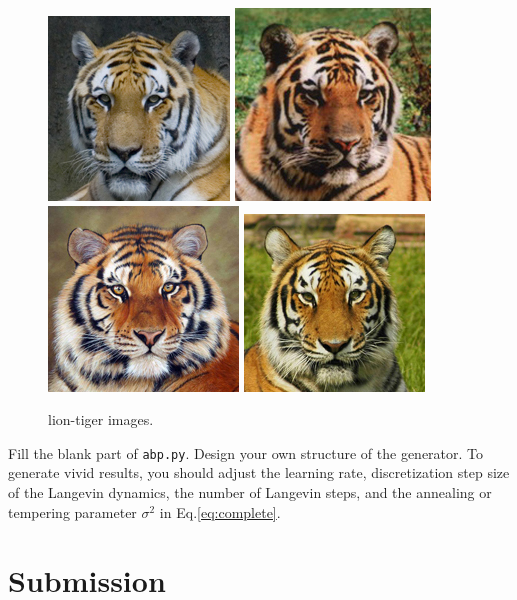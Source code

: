 \documentclass[11pt]{article}
\begin{document}
\begin{figure}[h]
{    	\includegraphics[width=.155\linewidth]{images/tiger_3.jpg}
    	\includegraphics[width=.16\linewidth]{images/tiger_4.jpg}
    	\includegraphics[width=.162\linewidth]{images/tiger_5.jpg}
    	\includegraphics[width=.16\linewidth]{images/tiger_6.jpg}
    }\\[3px]
	\caption{lion-tiger images.}
\end{figure}

Fill the blank part of \texttt{abp.py}. Design your own structure of the generator. To generate vivid results, you should adjust the learning rate, discretization step size of the Langevin dynamics, the number of Langevin steps, and the annealing or tempering parameter $\sigma^2$ in Eq.\ref{eq:complete}.

\section{Submission}
\end{document}

